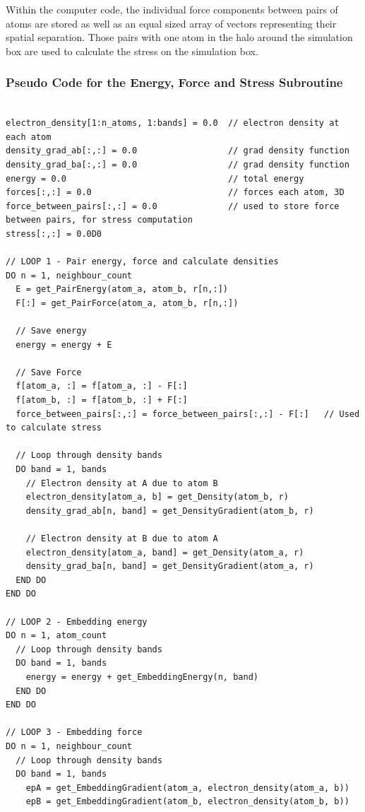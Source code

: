 Within the computer code, the individual force components between pairs of atoms are stored as well as an equal sized array of vectors representing their spatial separation.  Those pairs with one atom in the halo around the simulation box are used to calculate the stress on the simulation box.


\subsubsection{Pseudo Code for the Energy, Force and Stress Subroutine}

\begin{lstlisting}[style=sPseudo,caption={Pseudo Code for Energy and Stress Force Calculation}]

electron_density[1:n_atoms, 1:bands] = 0.0  // electron density at each atom
density_grad_ab[:,:] = 0.0                  // grad density function
density_grad_ba[:,:] = 0.0                  // grad density function
energy = 0.0                                // total energy
forces[:,:] = 0.0                           // forces each atom, 3D
force_between_pairs[:,:] = 0.0              // used to store force between pairs, for stress computation
stress[:,:] = 0.0D0

// LOOP 1 - Pair energy, force and calculate densities
DO n = 1, neighbour_count
  E = get_PairEnergy(atom_a, atom_b, r[n,:])
  F[:] = get_PairForce(atom_a, atom_b, r[n,:])

  // Save energy
  energy = energy + E

  // Save Force
  f[atom_a, :] = f[atom_a, :] - F[:]
  f[atom_b, :] = f[atom_b, :] + F[:]
  force_between_pairs[:,:] = force_between_pairs[:,:] - F[:]   // Used to calculate stress
  
  // Loop through density bands
  DO band = 1, bands
    // Electron density at A due to atom B
    electron_density[atom_a, b] = get_Density(atom_b, r)
    density_grad_ab[n, band] = get_DensityGradient(atom_b, r)
  
    // Electron density at B due to atom A
    electron_density[atom_a, band] = get_Density(atom_a, r)
    density_grad_ba[n, band] = get_DensityGradient(atom_a, r)
  END DO
END DO

// LOOP 2 - Embedding energy
DO n = 1, atom_count
  // Loop through density bands
  DO band = 1, bands
    energy = energy + get_EmbeddingEnergy(n, band)
  END DO
END DO

// LOOP 3 - Embedding force
DO n = 1, neighbour_count
  // Loop through density bands
  DO band = 1, bands
    epA = get_EmbeddingGradient(atom_a, electron_density(atom_a, b))
    epB = get_EmbeddingGradient(atom_b, electron_density(atom_b, b))


\end{lstlisting}
